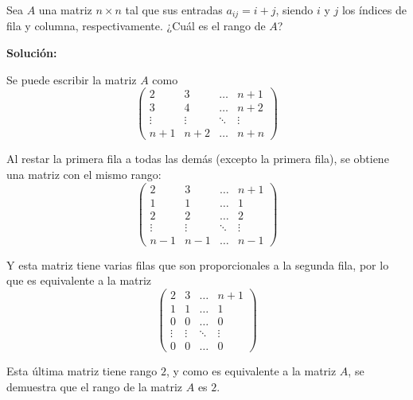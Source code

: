 \documentclass[../../main.tex]{subfiles}
\begin{document}
  \begin{shaded}
    Sea $A$ una matriz $n \times n$ tal que sus entradas $a_{ij} = i + j$, siendo $i$ y $j$ los índices de fila y columna, respectivamente. ¿Cuál es el rango de $A$?
  \end{shaded}

  \textbf{Solución:}

  Se puede escribir la matriz $A$ como
  $$
  \begin{pmatrix}
    2 & 3 & \dots & n + 1 \\
    3 & 4 & \dots & n + 2 \\
    \vdots & \vdots & \ddots & \vdots \\
    n + 1 & n + 2 & \dots & n + n
  \end{pmatrix}
  $$

  Al restar la primera fila a todas las demás (excepto la primera fila), se obtiene una matriz con el mismo rango:
  $$
  \begin{pmatrix}
    2 & 3 & \dots & n + 1 \\
    1 & 1 & \dots & 1 \\
    2 & 2 & \dots & 2 \\
    \vdots & \vdots & \ddots & \vdots \\
    n - 1 & n - 1 & \dots & n - 1
  \end{pmatrix}
  $$

  Y esta matriz tiene varias filas que son proporcionales a la segunda fila, por lo que es equivalente a la matriz
  $$
  \begin{pmatrix}
    2 & 3 & \dots & n + 1 \\
    1 & 1 & \dots & 1 \\
    0 & 0 & \dots & 0 \\
    \vdots & \vdots & \ddots & \vdots \\
    0 & 0 & \dots & 0
  \end{pmatrix}
  $$

  Esta última matriz tiene rango $2$, y como es equivalente a la matriz $A$, se demuestra que el rango de la matriz $A$ es $2$.
\end{document}

